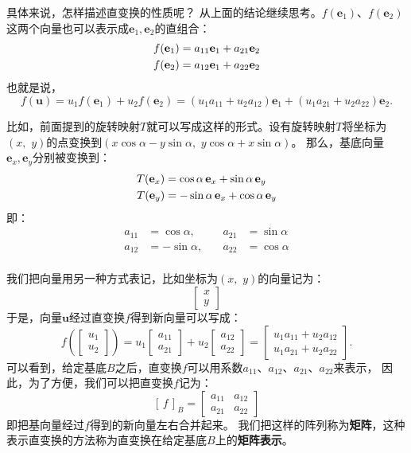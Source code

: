 \documentclass[12pt,UTF8]{ctexbook}
\begin{document}
具体来说，怎样描述直变换的性质呢？
从上面的结论继续思考。$f(\mathbf{e}_1)$、$f(\mathbf{e}_2)$这两个向量也可以表示成$\mathbf{e}_1, \mathbf{e}_2$的直组合：
\begin{align}
    f(\mathbf{e}_1) &= a_{11} \mathbf{e}_1 + a_{21} \mathbf{e}_2 \notag \\
    f(\mathbf{e}_2) &= a_{12} \mathbf{e}_1 + a_{22} \mathbf{e}_2 \notag
\end{align}
也就是说，
$$ f(\mathbf{u}) = u_1 f(\mathbf{e}_1) + u_2 f(\mathbf{e}_2) = (u_1a_{11} + u_2a_{12}) \mathbf{e}_1 + (u_1a_{21} + u_2a_{22}) \mathbf{e}_2.$$

比如，前面提到的旋转映射$T$就可以写成这样的形式。设有旋转映射$T$将坐标为$(x,\,\, y)$的点变换到$(x\cos{\alpha} - y\sin{\alpha},\,\,y\cos{\alpha} + x\sin{\alpha})$。
那么，基底向量$\mathbf{e}_x, \mathbf{e}_y$分别被变换到：
\begin{align}
    T(\mathbf{e}_x) &= \cos{\alpha}\,\mathbf{e}_x + \sin{\alpha}\,\mathbf{e}_y \notag \\
    T(\mathbf{e}_y) &= -\sin{\alpha}\,\mathbf{e}_x + \cos{\alpha}\,\mathbf{e}_y \notag 
\end{align}
即：
$$
\begin{array}{rlrl}
    a_{11} &= \cos{\alpha}, \quad & a_{21} &= \sin{\alpha} \\
    a_{12} &= -\sin{\alpha}, \quad & a_{22} &= \cos{\alpha} \\
\end{array}
$$

我们把向量用另一种方式表记，比如坐标为$(x, \,\,y)$的向量记为：
$$ \begin{bmatrix}
    x\\ y
\end{bmatrix}$$
于是，向量$\mathbf{u}$经过直变换$f$得到新向量可以写成：
$$ f\left(\begin{bmatrix}
    u_1\\ u_2
\end{bmatrix}\right) = u_1\begin{bmatrix}
    a_{11}\\ a_{21}
\end{bmatrix} + u_2 \begin{bmatrix}
    a_{12}\\ a_{22}
\end{bmatrix} = \begin{bmatrix}
    u_1a_{11} + u_2a_{12}\\ u_1a_{21} + u_2a_{22} 
\end{bmatrix}.$$
可以看到，给定基底$B$之后，直变换$f$可以用系数$a_{11}$、$a_{12}$、$a_{21}$、$a_{22}$来表示，
因此，为了方便，我们可以把直变换$f$记为：
$$
[\,f\,]_B = 
\begin{bmatrix}
    a_{11} & a_{12} \\ a_{21} & a_{22}
\end{bmatrix}
$$
即把基向量经过$f$得到的新向量左右合并起来。
我们把这样的阵列称为\textbf{矩阵}，这种表示直变换的方法称为直变换在给定基底$B$上的\textbf{矩阵表示}。
\end{document}
